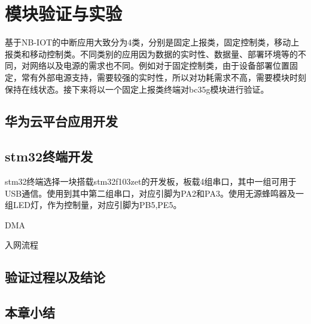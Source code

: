 \chapter{模块验证与实验}
基于NB-IOT的中断应用大致分为4类，分别是固定上报类，固定控制类，移动上报类和移动控制类。不同类别的应用因为数据的实时性、数据量、部署环境等的不同，对网络以及电源的需求也不同。例如对于固定控制类，由于设备部署位置固定，常有外部电源支持，需要较强的实时性，所以对功耗需求不高，需要模块时刻保持在线状态。接下来将以一个固定上报类终端对bc35g模块进行验证。
\section{华为云平台应用开发}
\section{stm32终端开发}
stm32终端选择一块搭载stm32f103zet的开发板，板载4组串口，其中一组可用于USB通信。使用到其中第二组串口，对应引脚为PA2和PA3。使用无源蜂鸣器及一组LED灯，作为控制量，对应引脚为PB5,PE5。

DMA


入网流程
\section{验证过程以及结论}

\section{本章小结}
